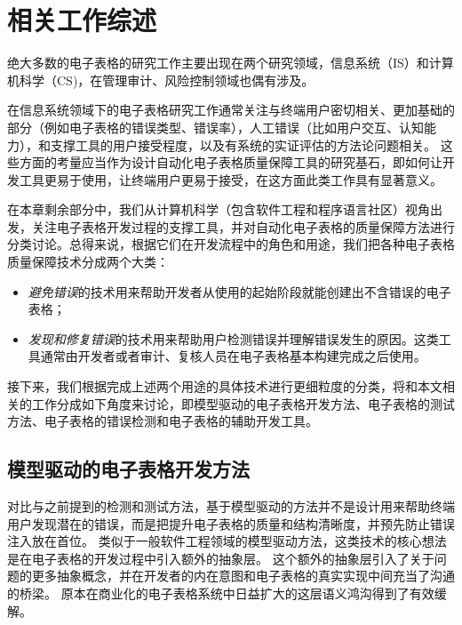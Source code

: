 \chapter{相关工作综述}

绝大多数的电子表格的研究工作主要出现在两个研究领域，信息系统（IS）和计算机科学（CS)，在管理审计、风险控制领域也偶有涉及\cite{creeth1985microcomputer,galletta1993empirical}。

在信息系统领域下的电子表格研究工作通常关注与终端用户密切相关、更加基础的部分（例如电子表格的错误类型、错误率），人工错误（比如用户交互、认知能力），和支撑工具的用户接受程度，以及有系统的实证评估的方法论问题相关\cite{reinhart2010growth,galletta1996spreadsheet,powell2008critical,howe2006factors,olson1987analysis,panko1998we}。
这些方面的考量应当作为设计自动化电子表格质量保障工具的研究基石，即如何让开发工具更易于使用，让终端用户更易于接受，在这方面此类工作具有显著意义。

在本章剩余部分中，我们从计算机科学（包含软件工程和程序语言社区）视角出发，关注电子表格开发过程的支撑工具，并对自动化电子表格的质量保障方法进行分类讨论。总得来说，根据它们在开发流程中的角色和用途，我们把各种电子表格质量保障技术分成两个大类：

\begin{itemize}
    \item \textit{避免错误}的技术用来帮助开发者从使用的起始阶段就能创建出不含错误的电子表格；
    \item \textit{发现和修复错误}的技术用来帮助用户检测错误并理解错误发生的原因。这类工具通常由开发者或者审计、复核人员在电子表格基本构建完成之后使用。
\end{itemize}




接下来，我们根据完成上述两个用途的具体技术进行更细粒度的分类，将和本文相关的工作分成如下角度来讨论，即模型驱动的电子表格开发方法、电子表格的测试方法、电子表格的错误检测和电子表格的辅助开发工具。

\section{模型驱动的电子表格开发方法}

对比与之前提到的检测和测试方法，基于模型驱动的方法并不是设计用来帮助终端用户发现潜在的错误，而是把提升电子表格的质量和结构清晰度，并预先防止错误注入放在首位。
类似于一般软件工程领域的模型驱动方法，这类技术的核心想法是在电子表格的开发过程中引入额外的抽象层。
这个额外的抽象层引入了关于问题的更多抽象概念，并在开发者的内在意图和电子表格的真实实现中间充当了沟通的桥梁。
原本在商业化的电子表格系统中日益扩大的这层语义鸿沟\cite{luckey2012systematic}得到了有效缓解。

